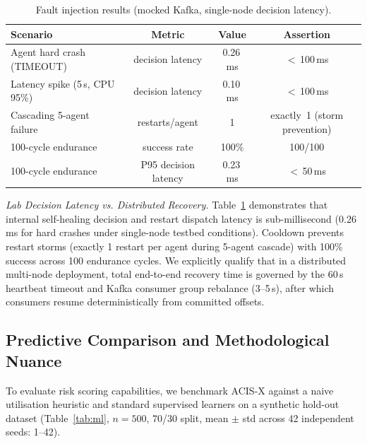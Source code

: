 \documentclass[runningheads]{llncs}
\begin{document}
\begin{table}[htbp]
\caption{Fault injection results (mocked Kafka, single-node decision latency).}
\label{tab:fault}
\centering\scriptsize
\begin{tabular}{@{}lccc@{}}
\toprule
\textbf{Scenario} & \textbf{Metric} & \textbf{Value} & \textbf{Assertion} \\
\midrule
Agent hard crash (TIMEOUT) & decision latency & 0.26\,ms & $<$\,100\,ms \\
Latency spike (5\,s, CPU 95\%) & decision latency & 0.10\,ms & $<$\,100\,ms \\
Cascading 5-agent failure & restarts/agent & 1 & exactly~1 (storm prevention) \\
100-cycle endurance & success rate & 100\% & 100/100 \\
100-cycle endurance & P95 decision latency & 0.23\,ms & $<$\,50\,ms \\
\bottomrule
\end{tabular}
\end{table}

\noindent\textit{Lab Decision Latency vs. Distributed Recovery.} Table~\ref{tab:fault} demonstrates that internal self-healing decision and restart dispatch latency is sub-millisecond (0.26\,ms for hard crashes under single-node testbed conditions). Cooldown prevents restart storms (exactly 1 restart per agent during 5-agent cascade) with 100\% success across 100 endurance cycles. We explicitly qualify that in a distributed multi-node deployment, total end-to-end recovery time is governed by the 60\,s heartbeat timeout and Kafka consumer group rebalance (3--5\,s), after which consumers resume deterministically from committed offsets.

\subsection{Predictive Comparison and Methodological Nuance}

To evaluate risk scoring capabilities, we benchmark ACIS-X against a naive utilisation heuristic and standard supervised learners on a synthetic hold-out dataset (Table~\ref{tab:ml}, $n=500$, 70/30 split, mean $\pm$ std across 42 independent seeds: 1--42). 
\end{document}
